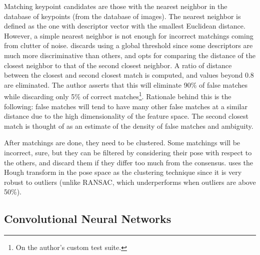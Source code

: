 \documentclass[../main.tex]{subfiles}
\begin{document}
Matching keypoint candidates are those with the nearest neighbor in the database of keypoints (from the database of images). The nearest neighbor is defined as the one with descriptor vector with the smallest Euclidean distance. However, a simple nearest neighbor is not enough for incorrect matchings coming from clutter of noise. \cite{SIFTlowe2004} discards using a global threshold since some descriptors are much more discriminative than others, and opts for comparing the distance of the closest neighbor to that of the second closest neighbor. A ratio of distance between the closest and second closest match is computed, and values beyond 0.8 are eliminated. The author asserts that this will eliminate 90\% of false matches while discarding only 5\% of correct matches\footnote{On the author's custom test suite.}. Rationale behind this is the following: false matches will tend to have many other false matches at a similar distance due to the high dimensionality of the feature space. The second closest match is thought of as an estimate of the density of false matches and ambiguity. 

After matchings are done, they need to be clustered. Some matchings will be incorrect, sure, but they can be filtered by considering their pose with respect to the others, and discard them if they differ too much from the consensus. \cite{SIFTlowe2004} uses the Hough transform in the pose space as the clustering technique since it is very robust to outliers (unlike RANSAC, which underperforms when outliers are above 50\%).




\subsection{Convolutional Neural Networks} \label{sec:world_neural_networks}
\end{document}
